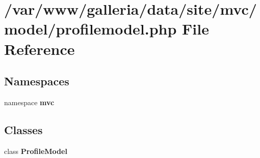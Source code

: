 \section{/var/www/galleria/data/site/mvc/model/profilemodel.php File Reference}
\label{profilemodel_8php}
\subsection*{Namespaces}
\begin{CompactItemize}
\item 
namespace {\bf mvc}
\end{CompactItemize}
\subsection*{Classes}
\begin{CompactItemize}
\item 
class {\bf ProfileModel}
\end{CompactItemize}

